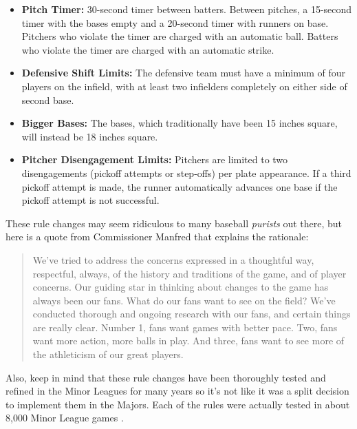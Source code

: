 \documentclass[12pt]{article}
\begin{document}
\begin{itemize}
  \item \textbf{Pitch Timer:} 30-second timer between batters. Between pitches,
  a 15-second timer with the bases empty and a 20-second timer with runners on base.
  Pitchers who violate the timer are charged with an automatic ball.
  Batters who violate the timer are charged with an automatic strike.

  \item \textbf{Defensive Shift Limits:} The defensive team must have a minimum
  of four players on the infield, with at least two infielders completely on either
  side of second base.

  \item \textbf{Bigger Bases:} The bases, which traditionally have been 15 inches
  square, will instead be 18 inches square.

  \item \textbf{Pitcher Disengagement Limits:} Pitchers are limited to two
  disengagements (pickoff attempts or step-offs) per plate appearance. If a third
  pickoff attempt is made, the runner automatically advances one base if the 
  pickoff attempt is not successful.
\end{itemize}

These rule changes may seem ridiculous to many baseball \emph{purists} out there,
but here is a quote from Commissioner Manfred that explains the rationale:

\begin{quote}
  We've tried to address the concerns expressed in a thoughtful way, respectful,
  always, of the history and traditions of the game, and of player concerns. Our
  guiding star in thinking about changes to the game has always been our fans.
  What do our fans want to see on the field? We've conducted thorough and ongoing
  research with our fans, and certain things are really clear. Number 1, fans want
  games with better pace. Two, fans want more action, more balls in play. And three,
  fans want to see more of the athleticism of our great players.
\end{quote}

Also, keep in mind that these rule changes have been thoroughly tested and refined
in the Minor Leagues for many years so it's not like it was a split decision to
implement them in the Majors. Each of the rules were actually tested in about 8,000
Minor League games \citep{Castrovince}.
\end{document}
